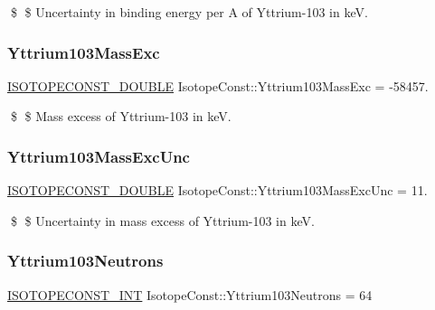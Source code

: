 \$ \$ Uncertainty in binding energy per A of Yttrium-\/103 in keV. \mbox{\label{group___isotope_const-_yttrium-_y103_ga3ed852973b96e9e61b5e816c987f01b6}} 
\subsubsection{\texorpdfstring{Yttrium103\+Mass\+Exc}{Yttrium103MassExc}}
{\footnotesize\ttfamily \mbox{\hyperlink{group___isotope_const-_macros_ga8f45a7272ce02c0b4c65c44636ed719a}{I\+S\+O\+T\+O\+P\+E\+C\+O\+N\+S\+T\+\_\+\+D\+O\+U\+B\+LE}} Isotope\+Const\+::\+Yttrium103\+Mass\+Exc = -\/58457.}

\$ \$ Mass excess of Yttrium-\/103 in keV. \mbox{\label{group___isotope_const-_yttrium-_y103_ga9d6fc5202b241315889d994ba33297a3}} 
\subsubsection{\texorpdfstring{Yttrium103\+Mass\+Exc\+Unc}{Yttrium103MassExcUnc}}
{\footnotesize\ttfamily \mbox{\hyperlink{group___isotope_const-_macros_ga8f45a7272ce02c0b4c65c44636ed719a}{I\+S\+O\+T\+O\+P\+E\+C\+O\+N\+S\+T\+\_\+\+D\+O\+U\+B\+LE}} Isotope\+Const\+::\+Yttrium103\+Mass\+Exc\+Unc = 11.}

\$ \$ Uncertainty in mass excess of Yttrium-\/103 in keV. \mbox{\label{group___isotope_const-_yttrium-_y103_ga378f0d037f5d8f61dd912f0a27eef17d}} 
\subsubsection{\texorpdfstring{Yttrium103\+Neutrons}{Yttrium103Neutrons}}
{\footnotesize\ttfamily \mbox{\hyperlink{group___isotope_const-_macros_ga5f18360b3e99483a35c32d789e62621c}{I\+S\+O\+T\+O\+P\+E\+C\+O\+N\+S\+T\+\_\+\+I\+NT}} Isotope\+Const\+::\+Yttrium103\+Neutrons = 64}

